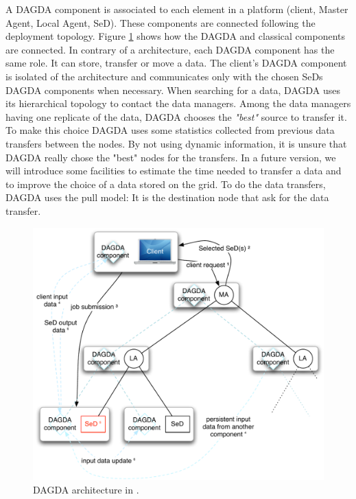 A DAGDA component is associated to each element in a \diet platform
(client, Master Agent, Local Agent, SeD). These components are connected
following the \diet deployment topology. Figure \ref{fig:DAGDAarch} shows how
the DAGDA and \diet classical components are connected. In contrary of a \diet
architecture, each DAGDA component has the same role. It can store, transfer
or move a data. The client's DAGDA component is isolated of the architecture and
communicates only with the chosen SeDs DAGDA components when necessary. When
searching for a data, DAGDA uses its hierarchical topology to contact the
data managers. Among the data managers having one replicate of the data,
DAGDA chooses the \textit{"best"} source to transfer it. To make this choice
DAGDA uses some statistics collected from previous data transfers between
the nodes. By not using dynamic information, it is unsure that DAGDA really
chose the "best" nodes for the transfers. In a future version, we will
introduce some facilities to estimate the time needed to transfer a data and
to improve the choice of a data stored on the grid. To do the data transfers,
DAGDA uses the pull model: It is the destination node that ask for the data
transfer.
\begin{figure}[h]
\centerline{\includegraphics[width=0.7\linewidth]{fig/dagdaArch}}
\caption{DAGDA architecture in \diet.\label{fig:DAGDAarch}}
\end{figure}

